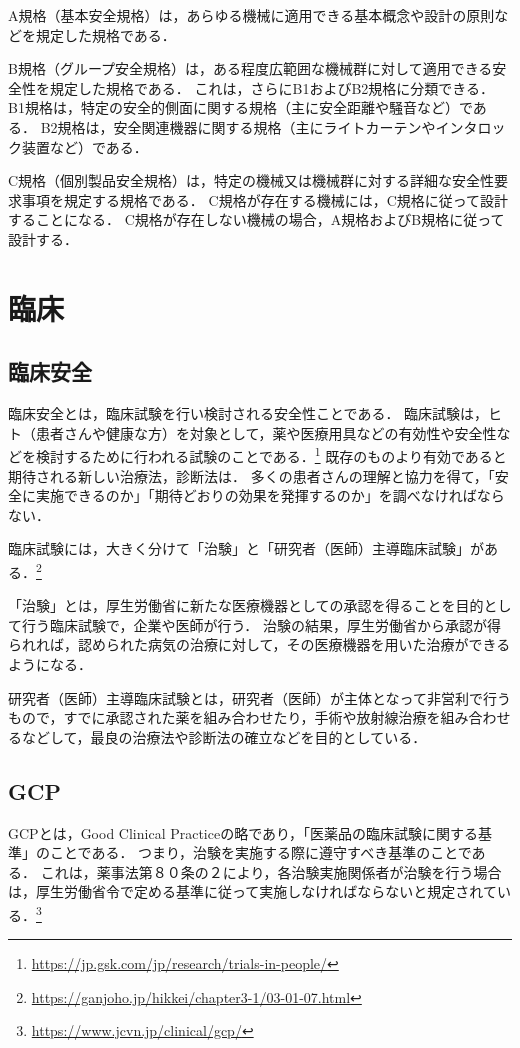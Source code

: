 \documentclass[uplatex,a4paper]{jsarticle}
\begin{document}
A規格（基本安全規格）は，あらゆる機械に適用できる基本概念や設計の原則などを規定した規格である．

B規格（グループ安全規格）は，ある程度広範囲な機械群に対して適用できる安全性を規定した規格である．
これは，さらにB1およびB2規格に分類できる．
B1規格は，特定の安全的側面に関する規格（主に安全距離や騒音など）である．
B2規格は，安全関連機器に関する規格（主にライトカーテンやインタロック装置など）である．

C規格（個別製品安全規格）は，特定の機械又は機械群に対する詳細な安全性要求事項を規定する規格である．
C規格が存在する機械には，C規格に従って設計することになる．
C規格が存在しない機械の場合，A規格およびB規格に従って設計する．



\section{臨床}
\subsection{臨床安全}
臨床安全とは，臨床試験を行い検討される安全性ことである．
臨床試験は，ヒト（患者さんや健康な方）を対象として，薬や医療用具などの有効性や安全性などを検討するために行われる試験のことである．\footnote{\url{https://jp.gsk.com/jp/research/trials-in-people/}}
既存のものより有効であると期待される新しい治療法，診断法は．
多くの患者さんの理解と協力を得て，「安全に実施できるのか」「期待どおりの効果を発揮するのか」を調べなければならない．

臨床試験には，大きく分けて「治験」と「研究者（医師）主導臨床試験」がある．\footnote{\url{https://ganjoho.jp/hikkei/chapter3-1/03-01-07.html}}

「治験」とは，厚生労働省に新たな医療機器としての承認を得ることを目的として行う臨床試験で，企業や医師が行う．
治験の結果，厚生労働省から承認が得られれば，認められた病気の治療に対して，その医療機器を用いた治療ができるようになる．

研究者（医師）主導臨床試験とは，研究者（医師）が主体となって非営利で行うもので，すでに承認された薬を組み合わせたり，手術や放射線治療を組み合わせるなどして，最良の治療法や診断法の確立などを目的としている．


\subsection{GCP}
GCPとは，Good Clinical Practiceの略であり，「医薬品の臨床試験に関する基準」のことである．
つまり，治験を実施する際に遵守すべき基準のことである．
これは，薬事法第８０条の２により，各治験実施関係者が治験を行う場合は，厚生労働省令で定める基準に従って実施しなければならないと規定されている．\footnote{\url{https://www.jcvn.jp/clinical/gcp/}}
\end{document}
